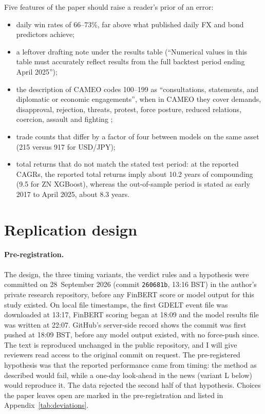 \documentclass[11pt]{article}
\begin{document}
Five features of the paper should raise a reader's prior of an error:
\begin{itemize}
  \item daily win rates of 66--73\%, far above what published daily FX and bond predictors achieve;
  \item a leftover drafting note under the results table (``Numerical values in this table must accurately reflect
        results from the full backtest period ending April 2025'');
  \item the description of CAMEO codes 100--199 as ``consultations, statements, and diplomatic or economic
        engagements'', when in CAMEO they cover demands, disapproval, rejection, threats, protest, force posture,
        reduced relations, coercion, assault and fighting \citep{cameo};
  \item trade counts that differ by a factor of four between models on the same asset (215 versus 917 for
        USD/JPY);
  \item total returns that do not match the stated test period: at the reported CAGRs, the reported total returns
        imply about 10.2 years of compounding (9.5 for ZN XGBoost), whereas the out-of-sample period is stated as
        early 2017 to April 2025, about 8.3 years.
\end{itemize}

\section{Replication design}
\paragraph{Pre-registration.} The design, the three timing variants, the verdict rules and a hypothesis were
committed on 28~September 2026 (commit \texttt{260681b}, 13:16 BST) in the author's private research repository,
before any FinBERT score or model output for this study existed. On local file timestamps, the first GDELT event
file was downloaded at 13:17, FinBERT scoring began at 18:09 and the model results file was written at 22:07. GitHub's server-side record shows
the commit was first pushed at 18:09 BST, before any model output existed, with no force-push since. The text is reproduced
unchanged in the public repository, and I will give reviewers read access to the original commit on request. The
pre-registered hypothesis was that the reported performance came from timing: the method as described would fail,
while a one-day look-ahead in the news (variant L below) would reproduce it. The data rejected the second half of
that hypothesis. Choices the paper leaves open are marked in the pre-registration and listed in
Appendix~\ref{tab:deviations}.
\end{document}
